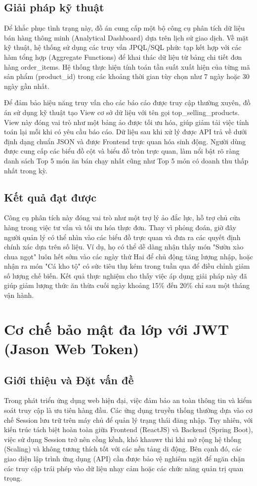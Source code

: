 \documentclass[../20232006p.tex]{subfiles}
\begin{document}
\subsection{Giải pháp kỹ thuật}
Để khắc phục tình trạng này, đồ án cung cấp một bộ công cụ phân tích dữ liệu bán hàng thông minh (Analytical Dashboard) dựa trên lịch sử giao dịch. Về mặt kỹ thuật, hệ thống sử dụng các truy vấn JPQL/SQL phức tạp kết hợp với các hàm tổng hợp (Aggregate Functions) để khai thác dữ liệu từ bảng chi tiết đơn hàng order\_items. Hệ thống thực hiện tính toán tần suất xuất hiện của từng mã sản phẩm (product\_id) trong các khoảng thời gian tùy chọn như 7 ngày hoặc 30 ngày gần nhất.

Để đảm bảo hiệu năng truy vấn cho các báo cáo được truy cập thường xuyên, đồ án sử dụng kỹ thuật tạo View cơ sở dữ liệu với tên gọi top\_selling\_products. View này đóng vai trò như một bảng ảo được tối ưu hóa, giúp giảm tải việc tính toán lại mỗi khi có yêu cầu báo cáo. Dữ liệu sau khi xử lý được API trả về dưới định dạng chuẩn JSON và được Frontend trực quan hóa sinh động. Người dùng được cung cấp các biểu đồ cột và biểu đồ tròn trực quan, làm nổi bật rõ ràng danh sách Top 5 món ăn bán chạy nhất cũng như Top 5 món có doanh thu thấp nhất trong kỳ.

\subsection{Kết quả đạt được}
Công cụ phân tích này đóng vai trò như một trợ lý ảo đắc lực, hỗ trợ chủ cửa hàng trong việc tư vấn và tối ưu hóa thực đơn. Thay vì phỏng đoán, giờ đây người quản lý có thể nhìn vào các biểu đồ trực quan và đưa ra các quyết định chính xác dựa trên số liệu. Ví dụ, họ có thể dễ dàng nhận thấy món "Sườn xào chua ngọt" luôn hết sớm vào các ngày thứ Hai để chủ động tăng lượng nhập, hoặc nhận ra món "Cá kho tộ" có sức tiêu thụ kém trong tuần qua để điều chỉnh giảm số lượng chế biến. Kết quả thực nghiệm cho thấy việc áp dụng giải pháp này đã giúp giảm lượng thức ăn thừa cuối ngày khoảng 15\% đến 20\% chỉ sau một tháng vận hành.

\section{Cơ chế bảo mật đa lớp với JWT (Jason Web Token)}

\subsection{Giới thiệu và Đặt vấn đề}
Trong phát triển ứng dụng web hiện đại, việc đảm bảo an toàn thông tin và kiểm soát truy cập là ưu tiên hàng đầu. Các ứng dụng truyền thống thường dựa vào cơ chế Session lưu trữ trên máy chủ để quản lý trạng thái đăng nhập. Tuy nhiên, với kiến trúc tách biệt hoàn toàn giữa Frontend (ReactJS) và Backend (Spring Boot), việc sử dụng Session trở nên cồng kềnh, khó khauwr thi khi mở rộng hệ thống (Scaling) và không tương thích tốt với các nền tảng di động. Bên cạnh đó, các giao diện lập trình ứng dụng (API) cần được bảo vệ nghiêm ngặt để ngăn chặn các truy cập trái phép vào dữ liệu nhạy cảm hoặc các chức năng quản trị quan trọng.
\end{document}
